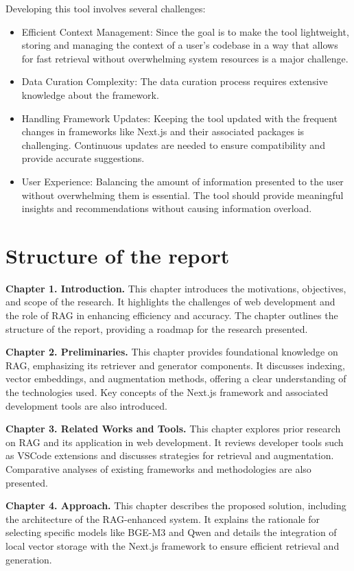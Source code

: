 Developing this tool involves several challenges:

\begin{itemize}
  \item Efficient Context Management: Since the goal is to make the tool lightweight, storing and managing the context of a user's codebase in a way that allows for fast retrieval without overwhelming system resources is a major challenge.
  \item Data Curation Complexity: The data curation process requires extensive knowledge about the framework.
  \item Handling Framework Updates: Keeping the tool updated with the frequent changes in frameworks like Next.js and their associated packages is challenging. Continuous updates are needed to ensure compatibility and provide accurate suggestions.
  \item User Experience: Balancing the amount of information presented to the user without overwhelming them is essential. The tool should provide meaningful insights and recommendations without causing information overload.
\end{itemize}

\section{Structure of the report}

\textbf{Chapter 1. Introduction.} 
This chapter introduces the motivations, objectives, and scope of the research. It highlights the challenges of web development and the role of RAG in enhancing efficiency and accuracy. The chapter outlines the structure of the report, providing a roadmap for the research presented.

\textbf{Chapter 2. Preliminaries.} 
This chapter provides foundational knowledge on RAG, emphasizing its retriever and generator components. It discusses indexing, vector embeddings, and augmentation methods, offering a clear understanding of the technologies used. Key concepts of the Next.js framework and associated development tools are also introduced.

\textbf{Chapter 3. Related Works and Tools.} 
This chapter explores prior research on RAG and its application in web development. It reviews developer tools such as VSCode extensions and discusses strategies for retrieval and augmentation. Comparative analyses of existing frameworks and methodologies are also presented.

\textbf{Chapter 4. Approach.} 
This chapter describes the proposed solution, including the architecture of the RAG-enhanced system. It explains the rationale for selecting specific models like BGE-M3 and Qwen and details the integration of local vector storage with the Next.js framework to ensure efficient retrieval and generation.

